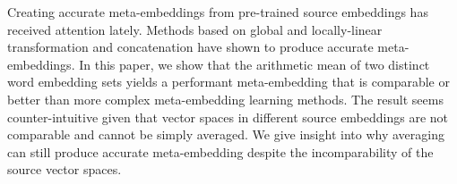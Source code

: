 Creating accurate meta-embeddings from pre-trained source embeddings has received attention lately. Methods based on global and locally-linear transformation and concatenation have shown to produce accurate meta-embeddings. In this paper, we show that the arithmetic mean of two distinct word embedding sets yields a performant meta-embedding that is comparable or better than more complex meta-embedding learning methods. The result seems counter-intuitive given that vector spaces in different source embeddings are not comparable and cannot be simply averaged. We give insight into why averaging can still produce accurate meta-embedding despite the incomparability of the source vector spaces.
